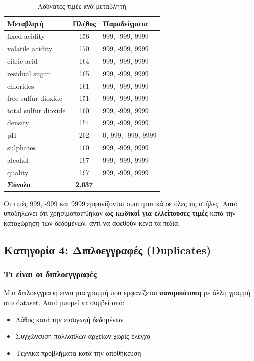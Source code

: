 \documentclass[12pt,a4paper]{article}
\begin{document}
\begin{table}[H]
\centering
\caption{Αδύνατες τιμές ανά μεταβλητή}
\label{tab:impossible}
\begin{tabular}{@{}lcp{6cm}@{}}
\toprule
\textbf{Μεταβλητή} & \textbf{Πλήθος} & \textbf{Παραδείγματα} \\
\midrule
fixed acidity & 156 & 999, -999, 9999 \\
volatile acidity & 170 & 999, -999, 9999 \\
citric acid & 164 & 999, -999, 9999 \\
residual sugar & 165 & 999, -999, 9999 \\
chlorides & 161 & 999, -999, 9999 \\
free sulfur dioxide & 151 & 999, -999, 9999 \\
total sulfur dioxide & 160 & 999, -999, 9999 \\
density & 154 & 999, -999, 9999 \\
pH & 202 & 0, 999, -999, 9999 \\
sulphates & 160 & 999, -999, 9999 \\
alcohol & 197 & 999, -999, 9999 \\
quality & 197 & 999, -999, 9999 \\
\midrule
\textbf{Σύνολο} & \textbf{2.037} & \\
\bottomrule
\end{tabular}
\end{table}

\begin{warningbox}[Παρατήρηση]
Οι τιμές 999, -999 και 9999 εμφανίζονται συστηματικά σε όλες τις στήλες. Αυτό υποδηλώνει ότι χρησιμοποιήθηκαν \textbf{ως κωδικοί για ελλείπουσες τιμές} κατά την καταχώρηση των δεδομένων, αντί να αφεθούν κενά τα πεδία.
\end{warningbox}

\subsection{Κατηγορία 4: Διπλοεγγραφές (Duplicates)}

\subsubsection{Τι είναι οι διπλοεγγραφές}

Μια διπλοεγγραφή είναι μια γραμμή που εμφανίζεται \textbf{πανομοιότυπη} με άλλη γραμμή στο dataset. Αυτό μπορεί να συμβεί από:
\begin{itemize}
    \item Λάθος κατά την εισαγωγή δεδομένων
    \item Συγχώνευση πολλαπλών αρχείων χωρίς έλεγχο
    \item Τεχνικά προβλήματα κατά την αποθήκευση
\end{itemize}
\end{document}
